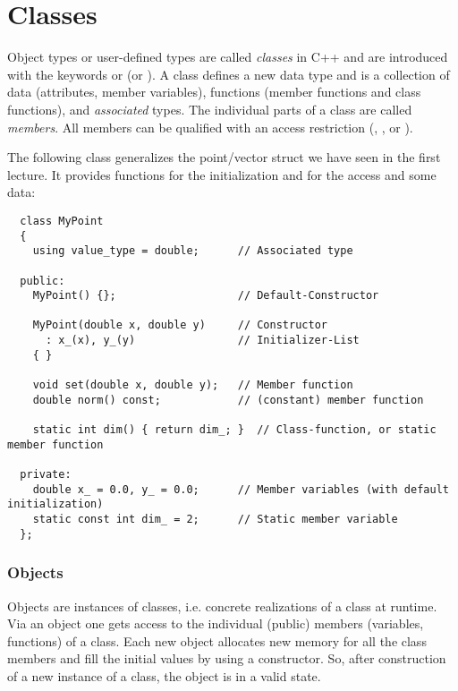 \chapter{Classes\label{sec:class}}
Object types or user-defined types are called \emph{classes} in C++ and are introduced with the keywords  or  (or ).
A class defines a new data type and is a collection of data (attributes, member variables), functions (member functions and class functions),
and \textit{associated} types. The individual parts of a class are called \emph{members}. All members can be qualified with an access restriction
(, , or ).

\begin{example}
The following class generalizes the point/vector struct we have seen in the first lecture. It provides functions for the initialization and for
the access and some data:
\end{example}
\begin{verbatim}
  class MyPoint
  {
    using value_type = double;      // Associated type

  public:
    MyPoint() {};                   // Default-Constructor

    MyPoint(double x, double y)     // Constructor
      : x_(x), y_(y)                // Initializer-List
    { }

    void set(double x, double y);   // Member function
    double norm() const;            // (constant) member function

    static int dim() { return dim_; }  // Class-function, or static member function

  private:
    double x_ = 0.0, y_ = 0.0;      // Member variables (with default initialization)
    static const int dim_ = 2;      // Static member variable
  };
\end{verbatim}

\subsection{Objects\label{sec:class-object}}
Objects are instances of classes, i.e. concrete realizations of a class at runtime. Via an object one gets access to the individual (public) members
(variables, functions) of a class. Each new object allocates new memory for all the class members and fill the initial values by using a constructor.
So, after construction of a new instance of a class, the object is in a valid state.

